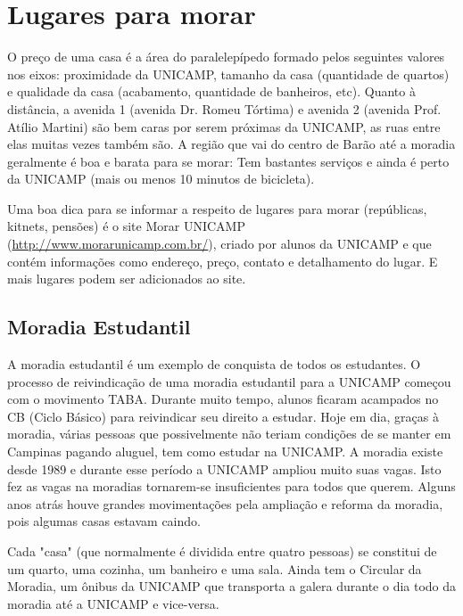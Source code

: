 
\section{Lugares para morar}

O preço de uma casa é a área do paralelepípedo formado pelos seguintes valores
nos eixos: proximidade da UNICAMP, tamanho da casa (quantidade de quartos)
e qualidade da casa (acabamento, quantidade de banheiros, etc). Quanto
à distância, a avenida 1 (avenida Dr. Romeu Tórtima) e avenida 2 (avenida Prof.
Atílio Martini) são bem caras por serem próximas da UNICAMP, as ruas entre elas
muitas vezes também são. A região que vai do centro de Barão até a moradia
geralmente é boa e barata para se morar: Tem bastantes serviços e ainda é perto
da UNICAMP (mais ou menos 10 minutos de bicicleta).

Uma boa dica para se informar a respeito de lugares para morar (repúblicas,
kitnets, pensões) é o site Morar UNICAMP
(\url{http://www.morarunicamp.com.br/}), criado por alunos da UNICAMP e que
contém informações como endereço, preço, contato e detalhamento do lugar. E mais
lugares podem ser adicionados ao site.

\subsection{Moradia Estudantil}

A moradia estudantil é um exemplo de conquista de todos os estudantes.
O processo de reivindicação de uma moradia estudantil para a UNICAMP começou com
o movimento TABA. Durante muito tempo, alunos ficaram acampados no CB (Ciclo
Básico) para reivindicar seu direito a estudar. Hoje em dia, graças à moradia,
várias pessoas que possivelmente não teriam condições de se manter em Campinas
pagando aluguel, tem como estudar na UNICAMP. A moradia existe desde 1989
e durante esse período a UNICAMP ampliou muito suas vagas. Isto fez as vagas na
moradias tornarem-se insuficientes para todos que querem. Alguns anos atrás
houve grandes movimentações pela ampliação e reforma da moradia, pois algumas
casas estavam caindo.

Cada "casa" (que normalmente é dividida entre quatro pessoas) se constitui de um
quarto, uma cozinha, um banheiro e uma sala. Ainda tem o Circular da Moradia, um
ônibus da UNICAMP que transporta a galera durante o dia todo da moradia até
a UNICAMP e vice-versa.

